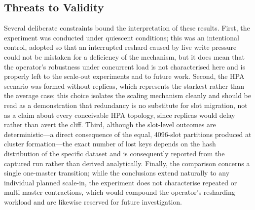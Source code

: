 \subsection{Threats to Validity}

Several deliberate constraints bound the interpretation of these results. First, the experiment
was conducted under quiescent conditions; this was an intentional control, adopted so that an
interrupted reshard caused by live write pressure could not be mistaken for a deficiency of the
mechanism, but it does mean that the operator's robustness under concurrent load is not
characterised here and is properly left to the scale-out experiments and to future work.
Second, the HPA scenario was formed without replicas, which represents the starkest rather than
the average case; this choice isolates the scaling mechanism cleanly and should be read as a
demonstration that redundancy is no substitute for slot migration, not as a claim about every
conceivable HPA topology, since replicas would delay rather than avert the cliff. Third,
although the slot-level outcomes are deterministic---a direct consequence of the equal,
\num{4096}-slot partitions produced at cluster formation---the exact number of lost keys depends
on the hash distribution of the specific dataset and is consequently reported from the captured
run rather than derived analytically. Finally, the comparison concerns a single one-master
transition; while the conclusions extend naturally to any individual planned scale-in, the
experiment does not characterise repeated or multi-master contractions, which would compound the
operator's resharding workload and are likewise reserved for future investigation.
